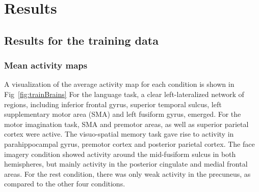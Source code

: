 \documentclass[fleqn,10pt]{SelfArx} %
\begin{document}
\section{Results}

\subsection{Results for the training data}

\subsubsection*{Mean activity maps}

A visualization of the average activity map for each condition is shown in Fig~\ref{fig:trainBrains} For the language task, a clear left-lateralized network of regions, including inferior frontal gyrus, superior temporal sulcus, left supplementary motor area (SMA) and left fusiform gyrus, emerged. For the motor imagination task, SMA and premotor areas, as well as superior parietal cortex were active. The visuo-spatial memory task gave rise to activity in parahippocampal gyrus, premotor cortex and posterior parietal cortex. The face imagery condition showed activity around the mid-fusiform sulcus in both hemispheres, but mainly activity in the posterior cingulate and medial frontal areas. For the rest condition, there was only weak activity in the precuneus, as compared to the other four conditions.
\end{document}
